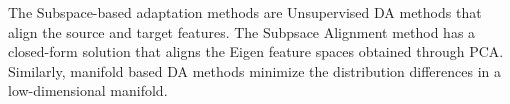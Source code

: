 \documentclass[twoside,twocolumn]{article}
\begin{document}
The Subspace-based adaptation methods are Unsupervised DA methods that align the source and target features.
The Subpsace Alignment method has a closed-form solution that aligns the Eigen feature spaces obtained through PCA.
Similarly, manifold based DA methods minimize the distribution differences in a low-dimensional manifold. 



\end{document}
